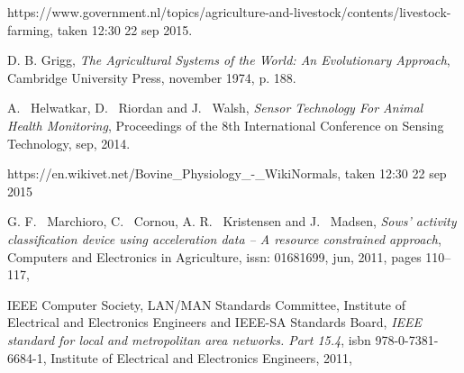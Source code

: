 \documentclass[conference]{IEEEtran}
\begin{document}
%
%
%
\begin{thebibliography}{1}

https://www.government.nl/topics/agriculture-and-livestock/contents/livestock-farming, taken 12:30 22 sep 2015.

D. B. Grigg, \emph{The Agricultural Systems of
the World: An Evolutionary Approach}, Cambridge University Press, november
1974, p. 188.

A. ~Helwatkar, D. ~Riordan and J. ~Walsh,
\emph{Sensor Technology For Animal Health Monitoring},
Proceedings of the 8th International Conference on Sensing Technology,
sep, 2014.

https://en.wikivet.net/Bovine\_Physiology\_-\_WikiNormals, taken 12:30 22 sep
2015 

G. F. ~Marchioro, C. ~Cornou, A. R. ~Kristensen and J. ~Madsen,
\emph{Sows’ activity classification device using acceleration data – A resource constrained approach},
Computers and Electronics in Agriculture,
issn: 01681699,
jun,
2011,
pages 110--117,

IEEE Computer Society, LAN/MAN Standards Committee, Institute of Electrical
and Electronics Engineers and IEEE-SA Standards Board, \emph{IEEE standard
for local and metropolitan area networks. Part 15.4}, isbn
978-0-7381-6684-1, Institute of Electrical and Electronics Engineers, 2011,


\end{thebibliography}


\end{document}
